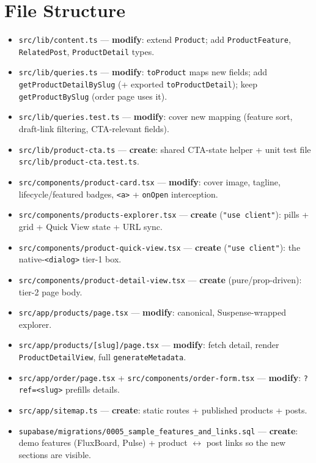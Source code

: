 \documentclass[11pt,a4paper]{article}
\begin{document}
\section{File Structure}

\begin{itemize}
  \item \texttt{src/lib/content.ts} --- \textbf{modify}: extend \texttt{Product}; add
        \texttt{ProductFeature}, \texttt{RelatedPost}, \texttt{ProductDetail} types.
  \item \texttt{src/lib/queries.ts} --- \textbf{modify}: \texttt{toProduct} maps new fields; add
        \texttt{getProductDetailBySlug} (+ exported \texttt{toProductDetail}); keep
        \texttt{getProductBySlug} (order page uses it).
  \item \texttt{src/lib/queries.test.ts} --- \textbf{modify}: cover new mapping (feature sort,
        draft-link filtering, CTA-relevant fields).
  \item \texttt{src/lib/product-cta.ts} --- \textbf{create}: shared CTA-state helper + unit test
        file \texttt{src/lib/product-cta.test.ts}.
  \item \texttt{src/components/product-card.tsx} --- \textbf{modify}: cover image, tagline,
        lifecycle/featured badges, \texttt{<a>} + \texttt{onOpen} interception.
  \item \texttt{src/components/products-explorer.tsx} --- \textbf{create} (\texttt{"use client"}):
        pills + grid + Quick View state + URL sync.
  \item \texttt{src/components/product-quick-view.tsx} --- \textbf{create} (\texttt{"use client"}):
        the native-\texttt{<dialog>} tier-1 box.
  \item \texttt{src/components/product-detail-view.tsx} --- \textbf{create} (pure/prop-driven):
        tier-2 page body.
  \item \texttt{src/app/products/page.tsx} --- \textbf{modify}: canonical, Suspense-wrapped
        explorer.
  \item \texttt{src/app/products/[slug]/page.tsx} --- \textbf{modify}: fetch detail, render
        \texttt{ProductDetailView}, full \texttt{generateMetadata}.
  \item \texttt{src/app/order/page.tsx} + \texttt{src/components/order-form.tsx} ---
        \textbf{modify}: \texttt{?ref=<slug>} prefills details.
  \item \texttt{src/app/sitemap.ts} --- \textbf{create}: static routes + published products + posts.
  \item \texttt{supabase/migrations/0005\_sample\_features\_and\_links.sql} --- \textbf{create}:
        demo features (FluxBoard, Pulse) + product $\leftrightarrow$ post links so the new
        sections are visible.
\end{itemize}
\end{document}
